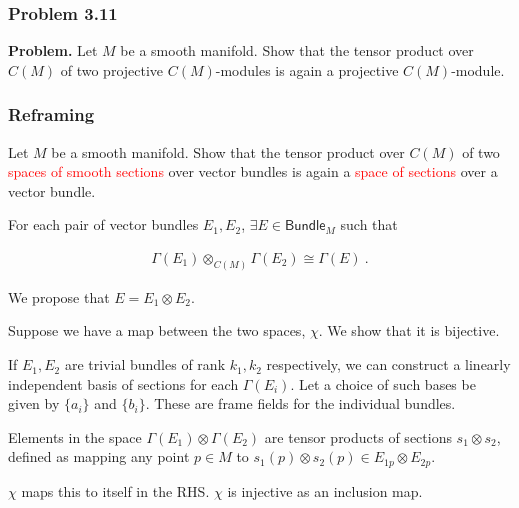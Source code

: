 \begin{frame}
    \frametitle{Problem 3.11}

    \textbf{Problem. } Let \(M\) be a smooth manifold. Show that the tensor product over \(C(M)\)
    of two projective \(C(M)\)-modules is again a projective \(C(M)\)-module.


\end{frame}

\begin{frame}
    \frametitle{Reframing}

    Let \(M\) be a smooth manifold. Show that the tensor product over \(C(M)\)
    of two \textcolor{red}{spaces of smooth sections} over vector bundles is
    again a \textcolor{red}{space of sections} over a vector bundle. \\ \pause

    For each pair of vector bundles \(E_1, E_2\), \(\exists E \in
    \textsf{Bundle}_M\) such that 
    
    \begin{gather*}        
        \Gamma(E_1) \otimes_{C(M)} \Gamma(E_2) \cong \Gamma(E)~.
    \end{gather*}



\end{frame}

\begin{frame}

    We propose that \(E = E_1\otimes E_2\). \pause

    Suppose we have a map between the two spaces, \(\chi\). We show that it is
    bijective. \pause

    If \(E_1, E_2\) are trivial bundles of rank \(k_1, k_2\) respectively, we
    can construct a linearly independent basis of sections for each
    \(\Gamma(E_i)\). Let a choice of such bases be given by \(\{a_i\}\) and
    \(\{b_i\}\). These are frame fields for the individual bundles. \\ \pause

    Elements in the space \(\Gamma(E_1) \otimes \Gamma(E_2)\) are tensor
    products of sections \(s_1 \otimes s_2\), defined as mapping any point \(p
    \in M\) to \(s_1(p)\otimes s_2(p) \in E_{1p} \otimes E_{2p}\). \\ \pause

    \(\chi\) maps this to itself in the RHS. \(\chi\) is injective as an
    inclusion map.


\end{frame}

